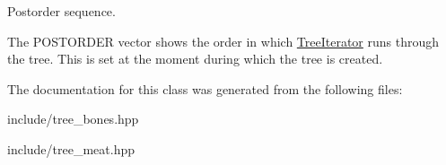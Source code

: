 Postorder sequence. 

The P\+O\+S\+T\+O\+R\+D\+ER vector shows the order in which \hyperlink{classTreeIterator}{Tree\+Iterator} runs through the tree. This is set at the moment during which the tree is created. 

The documentation for this class was generated from the following files\+:\begin{DoxyCompactItemize}
\item 
include/tree\+\_\+bones.\+hpp\item 
include/tree\+\_\+meat.\+hpp\end{DoxyCompactItemize}
